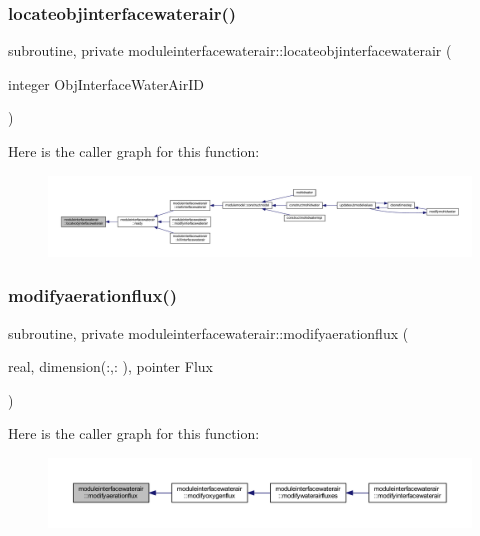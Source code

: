 \subsubsection{\texorpdfstring{locateobjinterfacewaterair()}{locateobjinterfacewaterair()}}
{\footnotesize\ttfamily subroutine, private moduleinterfacewaterair\+::locateobjinterfacewaterair (\begin{DoxyParamCaption}\item[{integer}]{Obj\+Interface\+Water\+Air\+ID }\end{DoxyParamCaption})\hspace{0.3cm}{\ttfamily [private]}}

Here is the caller graph for this function\+:\nopagebreak
\begin{figure}[H]
\begin{center}
\leavevmode
\includegraphics[width=350pt]{namespacemoduleinterfacewaterair_a17c41a363434acdb52729214d81e9e86_icgraph}
\end{center}
\end{figure}
\mbox{\label{namespacemoduleinterfacewaterair_a9e9d9c5604753ebdf47d735d1c6b2fe4}} 
\subsubsection{\texorpdfstring{modifyaerationflux()}{modifyaerationflux()}}
{\footnotesize\ttfamily subroutine, private moduleinterfacewaterair\+::modifyaerationflux (\begin{DoxyParamCaption}\item[{real, dimension(\+:,\+:  ), pointer}]{Flux }\end{DoxyParamCaption})\hspace{0.3cm}{\ttfamily [private]}}

Here is the caller graph for this function\+:\nopagebreak
\begin{figure}[H]
\begin{center}
\leavevmode
\includegraphics[width=350pt]{namespacemoduleinterfacewaterair_a9e9d9c5604753ebdf47d735d1c6b2fe4_icgraph}
\end{center}
\end{figure}
\mbox{\label{namespacemoduleinterfacewaterair_ad58b286425c066f4643dc56d5a605645}} 

